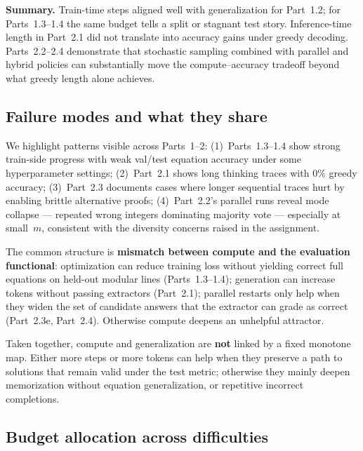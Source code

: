 \documentclass[11pt]{article}
\begin{document}
\textbf{Summary.} Train-time steps aligned well with generalization for Part~1.2; for Parts~1.3--1.4 the same budget tells a split or stagnant test story. Inference-time length in Part~2.1 did not translate into accuracy gains under greedy decoding. Parts~2.2--2.4 demonstrate that stochastic sampling combined with parallel and hybrid policies can substantially move the compute--accuracy tradeoff beyond what greedy length alone achieves.

\subsection{Failure modes and what they share}

We highlight patterns visible across Parts~1--2: (1)~Parts~1.3--1.4 show strong train-side progress with weak val/test equation accuracy under some hyperparameter settings; (2)~Part~2.1 shows long thinking traces with $0\%$ greedy accuracy; (3)~Part~2.3 documents cases where longer sequential traces hurt by enabling brittle alternative proofs; (4)~Part~2.2's parallel runs reveal mode collapse — repeated wrong integers dominating majority vote — especially at small~$m$, consistent with the diversity concerns raised in the assignment.

The common structure is \textbf{mismatch between compute and the evaluation functional}: optimization can reduce training loss without yielding correct full equations on held-out modular lines (Parts~1.3--1.4); generation can increase tokens without passing extractors (Part~2.1); parallel restarts only help when they widen the set of candidate answers that the extractor can grade as correct (Part~2.3e, Part~2.4). Otherwise compute deepens an unhelpful attractor.

Taken together, compute and generalization are \textbf{not} linked by a fixed monotone map. Either more steps or more tokens can help when they preserve a path to solutions that remain valid under the test metric; otherwise they mainly deepen memorization without equation generalization, or repetitive incorrect completions.

\subsection{Budget allocation across difficulties}
\end{document}
